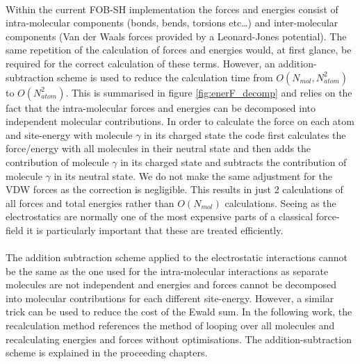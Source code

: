 \\
Within the current FOB-SH implementation the forces and energies consist of intra-molecular components (bonds, bends, torsions etc\ldots) and inter-molecular components (Van der Waals forces provided by a Leonard-Jones potential). The same repetition of the calculation of forces and energies would, at first glance, be required for the correct calculation of these terms. However, an addition-subtraction scheme is used to reduce the calculation time from $O(N_{mol}, N_{atom}^2)$ to $O(N_{atom}^2)$. This is summarised in figure \ref{fig:enerF_decomp} and relies on the fact that the intra-molecular forces and energies can be decomposed into independent molecular contributions. In order to calculate the force on each atom and site-energy with molecule $\gamma$ in its charged state the code first calculates the force/energy with all molecules in their neutral state and then adds the contribution of molecule $\gamma$ in its charged state and subtracts the contribution of molecule $\gamma$ in its neutral state. We do not make the same adjustment for the VDW forces as the correction is negligible. This results in just 2 calculations of all forces and total energies rather than $O(N_{mol})$ calculations. Seeing as the electrostatics are normally one of the most expensive parts of a classical force-field it is particularly important that these are treated efficiently.
\\\\
The addition subtraction scheme applied to the electrostatic interactions cannot be the same as the one used for the intra-molecular interactions as separate molecules are not independent and energies and forces cannot be decomposed into molecular contributions for each different site-energy. However, a similar trick can be used to reduce the cost of the Ewald sum. In the following work, the recalculation method references the method of looping over all molecules and recalculating energies and forces without optimisations. The addition-subtraction scheme is explained in the proceeding chapters.
